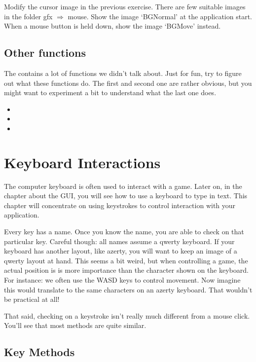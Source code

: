 \begin{exercise}
Modify the cursor image in the previous exercise. There are few suitable images in the folder gfx $\Rightarrow$ mouse.  Show the image `BGNormal' at the application start. When a mouse button is held down, show the image `BGMove' instead.
\end{exercise}

\subsection{Other functions}
The  contains a lot of functions we didn't talk about. Just for fun, try to figure out what these functions do. The first and second one are rather obvious, but you might want to experiment a bit to understand what the last one does. 

\begin{itemize}
	\item {}
	\item {}
	\item {}
\end{itemize}

\section{Keyboard Interactions}
The computer keyboard is often used to interact with a game. Later on, in the chapter about the GUI, you will see how to use a keyboard to type in text. This chapter will concentrate on using keystrokes to control interaction with your application.

Every key has a name. Once you know the name, you are able to check on that particular key. Careful though: all names assume a qwerty keyboard. If your keyboard has another layout, like azerty, you will want to keep an image of a qwerty layout at hand. This seems a bit weird, but when controlling a game, the actual position is is more importance than the character shown on the keyboard. For instance: we often use the WASD keys to control movement. Now imagine this would translate to the same characters on an azerty keyboard. That wouldn't be practical at all!

That said, checking on a keystroke isn't really much different from a mouse click. You'll see that most methods are quite similar.

\subsection{Key Methods}

